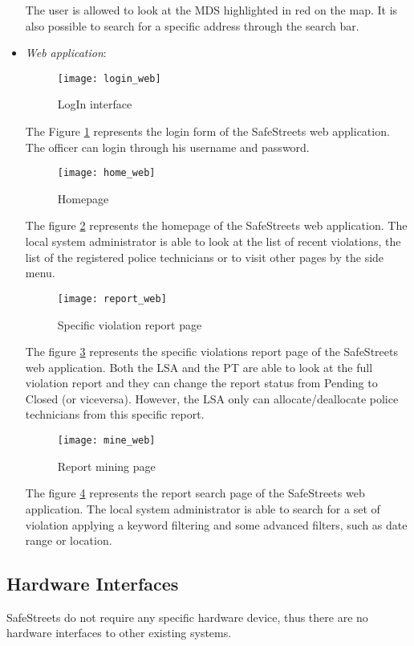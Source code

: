 \begin{itemize}
            The user is allowed to look at the MDS highlighted in red on the map. It is also
            possible to search for a specific address through the search bar.
            \newpage
    \item  \textit{Web application}:
    \begin{figure}[H]
        \centering
        \texttt{[image: login\_web]}
        \caption{LogIn interface}
        \label{fig:login_web}
    \end{figure}
    The Figure \ref{fig:login_web} represents the login form of the SafeStreets
    web application. The officer can login through his username
    and password.
    \begin{figure}[H]
        \centering
        \texttt{[image: home\_web]}
        \caption{Homepage}
        \label{fig:home_web}
    \end{figure}
    The figure \ref{fig:home_web} represents the homepage of the SafeStreets
    web application. The local system administrator is able to look at the list
    of recent violations, the list of the registered police technicians or to visit
    other pages by the side menu.
    \begin{figure}[H]
        \centering
        \texttt{[image: report\_web]}
        \caption{Specific violation report page}
        \label{fig:report_web}
    \end{figure}
    The figure \ref{fig:report_web} represents the specific violations report
    page of the SafeStreets web application. 
    Both the LSA and the PT are able to look at the full violation report and they can change the report status from Pending to Closed (or viceversa). However, the LSA only can allocate/deallocate police technicians from this specific report.
    \begin{figure}[H]
        \centering
        \texttt{[image: mine\_web]}
        \caption{Report mining page}
        \label{fig:mine_web}
    \end{figure}
    The figure \ref{fig:mine_web} represents the report search page of the SafeStreets web application. 
    The local system administrator is able to search for a set of violation applying a keyword filtering
    and some advanced filters, such as date range or location.
\end{itemize}

\subsection{Hardware Interfaces}
SafeStreets do not require any specific hardware device, 
thus there are no hardware interfaces to other existing systems.
